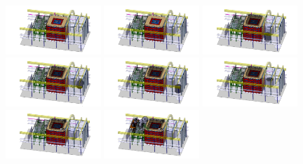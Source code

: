 \begin{figure}[!t]
\includegraphics[width=0.32\textwidth]{./Figures/assembly_sequence_11_07/44.png}
\includegraphics[width=0.32\textwidth]{./Figures/assembly_sequence_11_07/45.png}
\includegraphics[width=0.32\textwidth]{./Figures/assembly_sequence_11_07/46.png}
\includegraphics[width=0.32\textwidth]{./Figures/assembly_sequence_11_07/47.png}
\includegraphics[width=0.32\textwidth]{./Figures/assembly_sequence_11_07/48.png}
\includegraphics[width=0.32\textwidth]{./Figures/assembly_sequence_11_07/49.png}
\includegraphics[width=0.32\textwidth]{./Figures/assembly_sequence_11_07/50.png}
\includegraphics[width=0.32\textwidth]{./Figures/assembly_sequence_11_07/51.png}

\end{figure}
